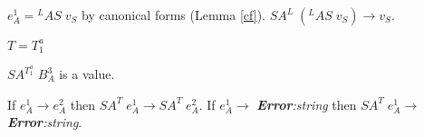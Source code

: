 \begin{case}
\begin{subcase}
$e_{A}^{1}={^{L}A}S\;v_{S}$ by canonical forms (Lemma \ref{cf}).  $SA^{L}\;(^{L}AS\;v_{S})\rightarrow v_{S}$.
\end{subcase}
\begin{subcase}
$T=T_{1}^{a}$

$SA^{T_{1}^{a}}\;B_{A}^{3}$ is a value.
\end{subcase}
If $e_{A}^{1}\rightarrow e_{A}^{2}$ then $SA^{T}\;e_{A}^{1}\rightarrow SA^{T}\;e_{A}^{2}$.  If $e_{A}^{1}\rightarrow$ \emph{\textbf{Error}:\;string} then $SA^{T}\;e_{A}^{1}\rightarrow$ \emph{\textbf{Error}:\;string}.
\end{case}